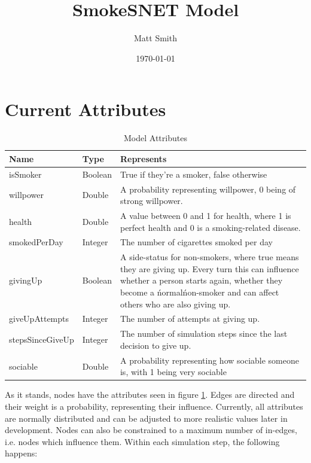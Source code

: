 \documentclass[]{article}
\begin{document}
\title{SmokeSNET Model}
\author{Matt Smith}
\date{\today}
\maketitle

\section{Current Attributes}

\begin{table}
    \begin{tabular}{|l|l|p{12cm}|}
        \hline
        Name & Type & Represents \\ \hline
        	isSmoker &  Boolean & True if they're a smoker, false otherwise \\ 
 	willpower &  Double & A probability representing willpower, 0 being of strong willpower. \\ 
	health &  Double & A value between 0 and 1 for health, where 1 is perfect health and 0 is a smoking-related disease.\\ 
	smokedPerDay &  Integer & The number of cigarettes smoked per day\\ 
	givingUp & Boolean & A side-status for non-smokers, where true means they are giving up. Every turn this can influence whether a person starts again, whether they become a \'normal\' non-smoker and can affect others who are also giving up. \\ 
 	giveUpAttempts & Integer & The number of attempts at giving up. \\ 
 	stepsSinceGiveUp &  Integer & The number of simulation steps since the last decision to give up. \\ 
	sociable &  Double & A probability representing how sociable someone is, with 1 being very sociable \\ 
        \hline
    \end{tabular}
\label{attr}
\caption{Model Attributes}
\end{table}
As it stands, nodes have the attributes seen in figure \ref{attr}.
Edges are directed and their weight is a probability, representing their influence.
Currently, all attributes are normally distributed and can be adjusted to more realistic values later in development.
Nodes can also be constrained to a maximum number of in-edges, i.e. nodes which influence them. Within each simulation step, the following happens:
\end{document}
